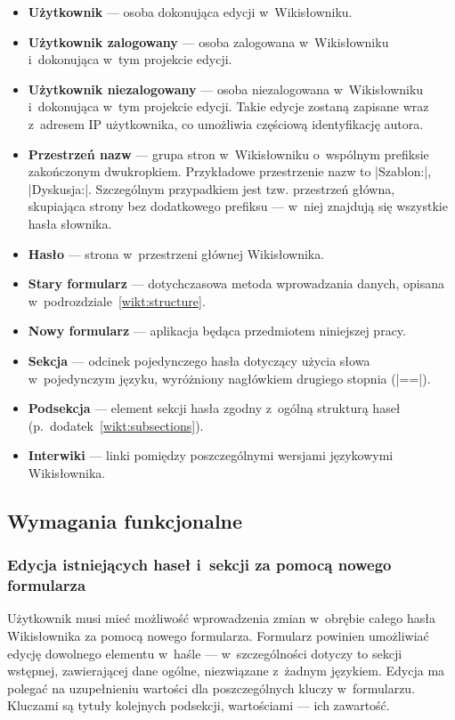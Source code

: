 \begin{itemize}
\item \textbf{Użytkownik} --- osoba dokonująca edycji w~Wikisłowniku.
\item \textbf{Użytkownik zalogowany} --- osoba zalogowana w~Wikisłowniku i~dokonująca w~tym projekcie edycji.
\item \textbf{Użytkownik niezalogowany} --- osoba niezalogowana w~Wikisłowniku i~dokonująca w~tym projekcie edycji. Takie edycje zostaną zapisane wraz z~adresem IP użytkownika, co umożliwia częściową identyfikację autora.
\item \textbf{Przestrzeń nazw} --- grupa stron w~Wikisłowniku o~wspólnym prefiksie zakończonym dwukropkiem. Przykładowe przestrzenie nazw to \kod|Szablon:|, \kod|Dyskusja:|. Szczególnym przypadkiem jest tzw. przestrzeń główna, skupiająca strony bez dodatkowego prefiksu --- w~niej znajdują się wszystkie hasła słownika.
\item \textbf{Hasło} --- strona w~przestrzeni głównej Wikisłownika.
\item \textbf{Stary formularz} --- dotychczasowa metoda wprowadzania danych, opisana w~podrozdziale~\ref{wikt:structure}.
\item \textbf{Nowy formularz} --- aplikacja będąca przedmiotem niniejszej pracy.
\item \textbf{Sekcja} --- odcinek pojedynczego hasła dotyczący użycia słowa w~pojedynczym języku, wyróżniony nagłówkiem drugiego stopnia (\kod|==|).
\item \textbf{Podsekcja} --- element sekcji hasła zgodny z~ogólną strukturą haseł (p.~dodatek~\ref{wikt:subsections}).
\item \textbf{Interwiki} --- linki pomiędzy poszczególnymi wersjami językowymi Wikisłownika.
\end{itemize}

\subsection{Wymagania funkcjonalne}
\subsubsection{Edycja istniejących haseł i~sekcji za pomocą nowego formularza}
Użytkownik musi mieć możliwość wprowadzenia zmian w~obrębie całego hasła Wikisłownika za pomocą nowego formularza. Formularz powinien umożliwiać edycję dowolnego elementu w~haśle --- w~szczególności dotyczy to sekcji wstępnej, zawierającej dane ogólne, niezwiązane z~żadnym językiem. Edycja ma polegać na uzupełnieniu wartości dla poszczególnych kluczy w~formularzu. Kluczami są tytuły kolejnych podsekcji, wartościami --- ich zawartość.

